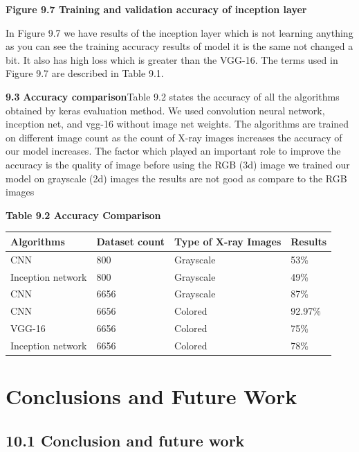 \documentclass{article} %
\begin{document}
\noindent \textbf{Figure 9.7 Training and validation accuracy of inception layer}

\noindent In Figure 9.7 we have results of the inception layer which is not learning anything as you can see the training accuracy results of model it is the same not changed a bit. It also has high loss which is greater than the VGG-16. The terms used in Figure 9.7 are described in Table 9.1.

\noindent \textbf{9.3} \textbf{Accuracy comparison}Table 9.2 states the accuracy of all the algorithms obtained by keras evaluation method. We used convolution neural network, inception net, and vgg-16 without image net weights. The algorithms are trained on different image count as the count of X-ray images increases the accuracy of our model increases. The factor which played an important role to improve the accuracy is the quality of image before using the RGB (3d) image we trained our model on grayscale (2d) images the results are not good as compare to the RGB images

\noindent \textbf{Table 9.2 Accuracy Comparison}

\begin{tabular}{|p{1.0in}|p{0.8in}|p{1.2in}|p{0.8in}|} \hline 
\textbf{Algorithms} & \textbf{Dataset count} & \textbf{Type of X-ray Images} & \textbf{Results} \\ \hline 
CNN & 800 & Grayscale & 53\% \\ \hline 
Inception network & 800 & Grayscale & 49\% \\ \hline 
CNN & 6656 & Grayscale & 87\% \\ \hline 
CNN & 6656 & Colored & 92.97\% \\ \hline 
VGG-16 & 6656 & Colored & 75\% \\ \hline 
Inception network & 6656 & Colored & 78\% \\ \hline 
\end{tabular}

\textbf{}

\noindent \textbf{\eject }


\section{ Conclusions and Future Work}

\noindent 
\subsection{10.1 Conclusion and future work}
\end{document}
